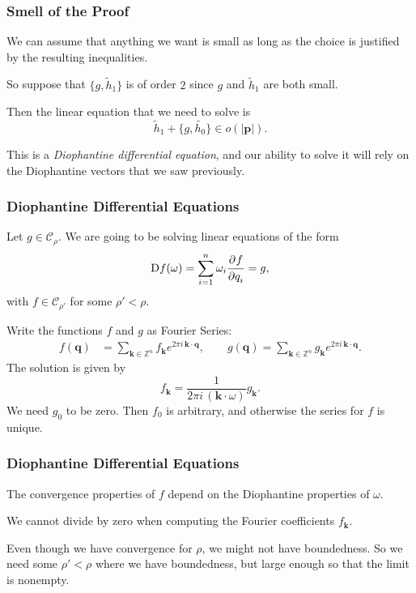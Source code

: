 \documentclass{beamer}
\newcommand{\Z}{\mathbb{Z}}
\newcommand{\bp}[1]{\bm{#1}}
\newcommand{\Dif}{\mathop{}\!\mathrm{D}}
\newcommand\pd[3][]{\frac{\strut\partial^{#1}#2}{\strut\partial#3^{#1}}}
\begin{document}
\begin{frame}
  \frametitle{Smell of the Proof}
  We can assume that anything we want is small as long as the choice is
  justified by the resulting inequalities.

  So suppose that $\{g, \tilde{h}_1\}$ is of order $2$ since $g$ and
  $\tilde{h}_1$ are both small.

  Then the linear equation that we need to solve is
  \begin{equation*}
    \tilde{h}_1 + \{g, \tilde{h_0}\} \in o(|\bp{p}|).
  \end{equation*}

  This is a \emph{Diophantine differential equation}, and our ability to solve
  it will rely on the Diophantine vectors that we saw previously.
\end{frame}

\begin{frame}
  \frametitle{Diophantine Differential Equations}
  Let $g \in \mathcal{C}_\rho$.
  We are going to be solving linear equations of the form
  \begin{equation*}
    \Dif f(\omega) = \sum_{i = 1}^n \omega_i \pd{f}{q_i} = g,
  \end{equation*}
  with $f \in \mathcal{C}_{\rho'}$ for some $\rho' < \rho$.

  Write the functions $f$ and $g$ as Fourier Series:
  \begin{align*}
    f(\bp{q}) &= \sum_{\bp{k} \in \Z^n} f_{\bp{k}} e^{2 \pi i \, \bp{k} \cdot
      \bp{q}},\qquad g(\bp{q}) = \sum_{\bp{k} \in \Z^n} g_{\bp{k}} e^{2 \pi i \,
                \bp{k} \cdot \bp{q}}.
  \end{align*}
  The solution is given by
  \begin{equation*}
    f_{\bp{k}} = \frac{1}{2 \pi i \, (\bp{k} \cdot \omega)} g_{\bp{k}}.
  \end{equation*}
  We need $g_0$ to be zero.
  Then $f_0$ is arbitrary, and otherwise the series for $f$ is unique.
\end{frame}

\begin{frame}
  \frametitle{Diophantine Differential Equations}
  The convergence properties of $f$ depend on the Diophantine properties of
  $\omega$.

  We cannot divide by zero when computing the Fourier coefficients $f_{\bp{k}}$.
  
  Even though we have convergence for $\rho$, we might not have boundedness.
  So we need some $\rho' < \rho$ where we have boundedness, but large enough so
  that the limit is nonempty.
\end{frame}
\end{document}
